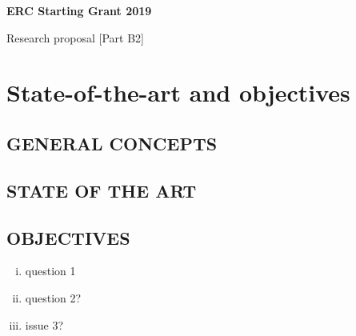 

\pagestyle{B2}

\usepackage{pifont}

 \usepackage{multirow}

\begin{center}

{\bf ERC Starting Grant 2019

Research proposal [Part B2]}

\vspace{0.25in}

\end{center}

\section{State-of-the-art and objectives}

\subsection{GENERAL CONCEPTS}

\lipsum[3]

\begin{figure}[!h]
\centering
\caption{}
\label{fig1}
\end{figure}

\begin{mdframed}[backgroundcolor=bgc]
\lipsum[1]
\end{mdframed}



\subsection{STATE OF THE ART}
\label{sota}

\lipsum[3]



\subsection{OBJECTIVES}
\lipsum[1]
\begin{enumerate}[i)]
\item question 1

\item  question 2?

\item  issue 3?

\end{enumerate}

